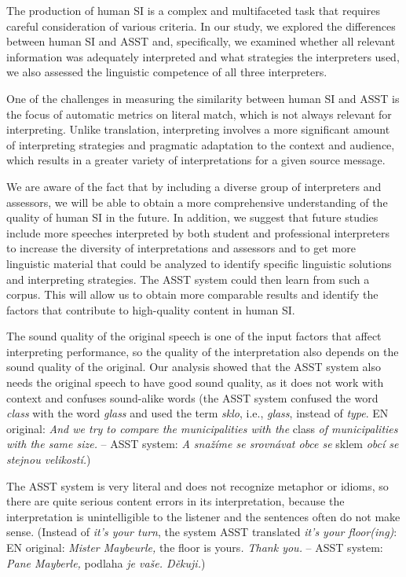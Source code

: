 \documentclass[output=paper]{langscibook}
\begin{document}
The production of human SI is a complex and multifaceted task that requires careful consideration of various criteria. In our study, we explored the differences between human SI and ASST and, specifically, we examined whether all relevant information was adequately interpreted and what strategies the interpreters used, we also assessed the linguistic competence of all three interpreters.

One of the challenges in measuring the similarity between human SI and ASST is the focus of automatic metrics on literal match, which is not always relevant for interpreting. Unlike translation, interpreting involves a more significant amount of interpreting strategies and pragmatic adaptation to the context and audience, which results in a greater variety of interpretations for a given source message.

We are aware of the fact that by including a diverse group of interpreters and assessors, we will be able to obtain a more comprehensive understanding of the quality of human SI in the future. In addition, we suggest that future studies include more speeches interpreted by both student and professional interpreters to increase the diversity of interpretations and assessors and to get more linguistic material that could be analyzed to identify specific linguistic solutions and interpreting strategies. The ASST system could then learn from such a corpus. This will allow us to obtain more comparable results and identify the factors that contribute to high-quality content in human SI.

The sound quality of the original speech is one of the input factors that affect interpreting performance, so the quality of the interpretation also depends on the sound quality of the original. Our analysis showed that the ASST system also needs the original speech to have good sound quality, as it does not work with context and confuses sound-alike words (the ASST system confused the word \textit{class} with the word \textit{glass} and used the term \textit{sklo}, i.e., \textit{glass}, instead of \textit{type}. EN original: \textit{And we try to compare the municipalities with the} class \textit{of municipalities with the same size.} – ASST system: \textit{A snažíme se srovnávat obce se} sklem \textit{obcí se stejnou velikostí.})

The ASST system is very literal and does not recognize metaphor or idioms, so there are quite serious content errors in its interpretation, because the interpretation is unintelligible to the listener and the sentences often do not make sense. (Instead of \textit{it’s your turn}, the system ASST translated \textit{it’s your floor(ing)}: EN original: \textit{Mister Maybeurle,} the floor is yours\textit{. Thank you.} – ASST system: \textit{Pane Mayberle,} podlaha \textit{je vaše. Děkuji.})
\end{document}
